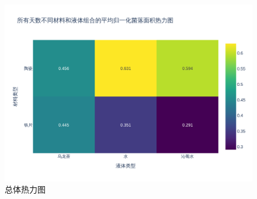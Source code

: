 \documentclass[12pt,a4paper]{ctexart}
\begin{document}
\begin{figure}[H]  %
    \centering  %
    \includegraphics[width=\textwidth]{./plot/General/heatmap_normalized_overall.png}  %
    \caption{总体热力图}  %
    \label{fig:GeneralHeat}  %
\end{figure}
\end{document}
